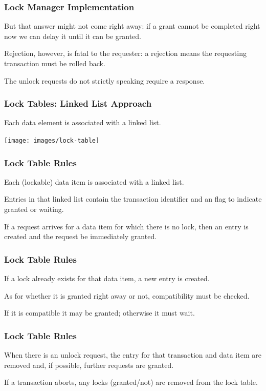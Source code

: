\begin{frame}
\frametitle{Lock Manager Implementation}


But that answer might not come right away: if a grant cannot be completed right now we can delay it until it can be granted. 

Rejection, however, is fatal to the requester: a rejection means the requesting transaction must be rolled back. 

The unlock requests do not strictly speaking require a response.


\end{frame}

\begin{frame}
\frametitle{Lock Tables: Linked List Approach}

Each data element is associated with a linked list. 



\begin{center}
	\texttt{[image: images/lock-table]}
\end{center}


\end{frame}

\begin{frame}
\frametitle{Lock Table Rules}

Each (lockable) data item is associated with a linked list. 

Entries in that linked list contain the transaction identifier and an flag to indicate granted or waiting.

If a request arrives for a data item for which there is no lock, then an entry is created and the request be immediately granted. 

\end{frame}

\begin{frame}
\frametitle{Lock Table Rules}
If a lock already exists for that data item, a new entry is created. 

As for whether it is granted right away or not, compatibility must be checked. 

If it is compatible it may be granted; otherwise it must wait. 

\end{frame}

\begin{frame}
\frametitle{Lock Table Rules}

When there is an unlock request, the entry for that transaction and data item are removed and, if possible, further requests are granted. 

If a transaction aborts, any locks (granted/not) are removed from the lock table.

\end{frame}

